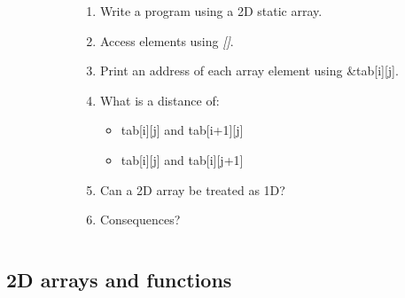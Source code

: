 \documentclass[10pt]{beamer}
\begin{document}
\begin{frame}[fragile]
\begin{columns}
\begin{column}{0.65\textwidth}
    \end{column}
    \begin{column}{0.5\textwidth}
    \begin{enumerate}
      \item Write a program using a 2D static array.
      \item Access elements using \textit{[]}.
      \item Print an address of each array element using \&tab[i][j].
      \item What is a distance of:
      \begin{itemize}
        \item tab[i][j] and tab[i+1][j]
        \item tab[i][j] and tab[i][j+1]
      \end{itemize}
      \item Can a 2D array be treated as 1D?
      \item Consequences?
    \end{enumerate}

    \end{column}
  \end{columns}
\end{frame}

\subsection{2D arrays and functions}
\end{document}
